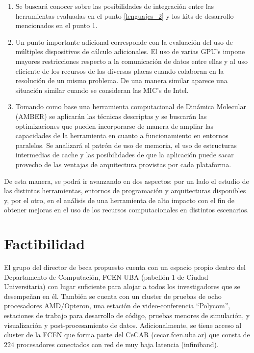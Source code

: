 \documentclass[a4paper,10pt]{article}
\begin{document}
\begin{enumerate}
\item Se buscar\'a conocer sobre las posibilidades de integraci\'on entre las herramientas evaluadas en el punto \ref{lenguajes_2} y los kits de desarrollo mencionados en el punto 1.

\item Un punto importante adicional corresponde con la evaluaci\'on del uso de m\'ultiples dispositivos de c\'alculo adicionales. El uso de varias GPU's impone mayores restricciones respecto a la comunicaci\'on de datos entre ellas y al uso eficiente de los recursos de las diversas placas cuando colaboran en la resoluci\'on de un mismo problema. De una manera similar aparece una situaci\'on similar cuando se consideran las MIC's de Intel.

\item Tomando como base una herramienta computacional de Din\'amica Molecular (AMBER) se aplicar\'an las t\'ecnicas descriptas y se buscar\'an las optimizaciones que pueden incorporarse de manera de ampliar las capacidades de la herramienta en cuanto a funcionamiento en entornos paralelos. Se analizar\'a el patr\'on de uso de memoria, el uso de estructuras intermedias de cache y las posibilidades de que la aplicaci\'on puede sacar provecho de las ventajas de arquitectura provistas por cada plataforma.

\end{enumerate}

De esta manera, se podr\'a ir avanzando en dos aspectos: por un lado el estudio de las distintas herramientas, entornos de programaci\'on y arquitecturas disponibles y, por el otro, en el an\'alisis de una herramienta de alto impacto con el fin de obtener mejoras en el uso de los recursos computacionales en distintos escenarios.


\section*{Factibilidad}
El grupo del director de beca propuesto cuenta con un espacio propio dentro del Departamento de Computaci\'on, FCEN-UBA (pabell\'on 1 de Ciudad Universitaria) con lugar suficiente para alojar a todos los investigadores que se desempe\~nan en \'el. Tambi\'en se cuenta con un cluster de pruebas de ocho procesadores AMD/Opteron, una estaci\'on de video-conferencia ``Polycom'', estaciones de trabajo para desarrollo de c\'odigo, pruebas menores de simulaci\'on, y visualizaci\'on y post-procesamiento de datos. 
Adicionalmente, se tiene acceso al cluster de la FCEN que forma parte del CeCAR (\url{cecar.fcen.uba.ar}) que consta de $224$ procesadores conectados con red de muy baja latencia (infiniband).
\end{document}
